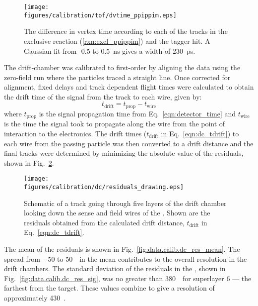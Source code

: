 \begin{figure}\begin{center}
\texttt{[image: \\figures/calibration/tof/dvtime\_ppippim.eps]}
\caption[ Timing Resolution]{\label{fig:data.calib.tof_dvtime_ppippim}The difference in  vertex time according to each of the tracks in the exclusive reaction (\ref{rxn:excl_ppippim}) and the tagger hit. A Gaussian fit from -0.5 to 0.5~ns gives a width of $230$~ps.}
\end{center}\end{figure}

The drift-chamber was calibrated to first-order by aligning the data using the zero-field run where the particles traced a straight line. Once corrected for alignment, fixed delays and track dependent flight times were calculated to obtain the drift time of the signal from the track to each wire, given by\cite{clas.dc.calib}:
\begin{equation}
    t_\mathrm{drift} = t_\mathrm{prop} - t_\mathrm{wire}
    \label{eqn:dc_tdrift}
\end{equation}
where $t_\mathrm{prop}$ is the signal propagation time from Eq.~\ref{eqn:detector_time} and $t_\mathrm{wire}$ is the time the signal took to propagate along the wire from the point of interaction to the electronics. The drift times ($t_\mathrm{drift}$ in Eq.~\ref{eqn:dc_tdrift}) to each wire from the passing particle was then converted to a drift distance and the final tracks were determined by minimizing the absolute value of the residuals, shown in Fig.~\ref{fig:data.calib.residuals_draw}.

\begin{figure}\begin{center}
\texttt{[image: \\figures/calibration/dc/residuals\_drawing.eps]}
\caption[ Residuals Schematic]{\label{fig:data.calib.residuals_draw}Schematic of a track going through five layers of the drift chamber looking down the sense and field wires of the . Shown are the residuals obtained from the calculated drift distance, $t_\mathrm{drift}$ in Eq.~\ref{eqn:dc_tdrift}.}
\end{center}\end{figure}

The mean of the residuals is shown in Fig.~\ref{fig:data.calib.dc_res_mean}. The spread from $-50$ to 50~\um\ in the mean contributes to the overall resolution in the drift chambers. The standard deviation of the residuals in the , shown in Fig.~\ref{fig:data.calib.dc_res_sig}, was no greater than 380~\um\ for superlayer 6 --- the farthest from the target. These values combine to give a resolution of approximately 430~\um.

